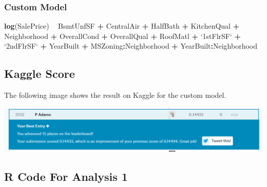 \documentclass[american,]{article}
\newenvironment{Shaded}{\begin{snugshade}}{\end{snugshade}}
\newcommand{\DataTypeTok}[1]{\textcolor[rgb]{0.13,0.29,0.53}{#1}}
\newcommand{\KeywordTok}[1]{\textcolor[rgb]{0.13,0.29,0.53}{\textbf{#1}}}
\newcommand{\NormalTok}[1]{#1}
\newcommand{\OperatorTok}[1]{\textcolor[rgb]{0.81,0.36,0.00}{\textbf{#1}}}
\newcommand{\StringTok}[1]{\textcolor[rgb]{0.31,0.60,0.02}{#1}}
\begin{document}
\hypertarget{custom-model}{%
\subsubsection{Custom Model}\label{custom-model}}

\label{appendix:customSelection}

\begin{Shaded}
\begin{Highlighting}[]
\KeywordTok{log}\NormalTok{(SalePrice) }\OperatorTok{~}\StringTok{ }
\StringTok{            }\NormalTok{BsmtUnfSF }\OperatorTok{+}\StringTok{ }\NormalTok{CentralAir }\OperatorTok{+}\StringTok{ }\NormalTok{HalfBath }\OperatorTok{+}\StringTok{ }\NormalTok{KitchenQual }\OperatorTok{+}\StringTok{ }\NormalTok{Neighborhood }\OperatorTok{+}
\StringTok{            }\NormalTok{OverallCond }\OperatorTok{+}\StringTok{ }\NormalTok{OverallQual }\OperatorTok{+}\StringTok{ }\NormalTok{RoofMatl }\OperatorTok{+}\StringTok{ `}\DataTypeTok{1stFlrSF}\StringTok{`} \OperatorTok{+}\StringTok{ `}\DataTypeTok{2ndFlrSF}\StringTok{`} \OperatorTok{+}\StringTok{ }
\StringTok{            }\NormalTok{YearBuilt }\OperatorTok{+}\StringTok{ }\NormalTok{MSZoning}\OperatorTok{:}\NormalTok{Neighborhood }\OperatorTok{+}\StringTok{ }\NormalTok{YearBuilt}\OperatorTok{:}\NormalTok{Neighborhood}
\end{Highlighting}
\end{Shaded}

\hypertarget{kaggle-score}{%
\subsection{Kaggle Score}\label{kaggle-score}}

The following image shows the result on Kaggle for the custom model.

\begin{center}\includegraphics[width=0.75\linewidth]{./Evidence for Model Score on Kaggle} \end{center}

\newpage

\hypertarget{r-code-for-analysis-1}{%
\subsection{R Code For Analysis 1}\label{r-code-for-analysis-1}}
\end{document}
